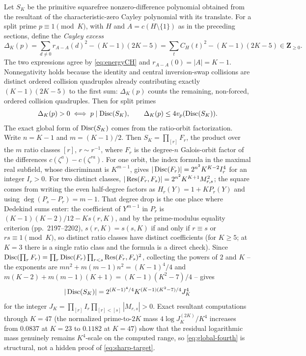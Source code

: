 Let $S_K$ be the primitive squarefree nonzero-difference polynomial obtained
from the resultant of the characteristic-zero Cayley polynomial with its
translate.  For a split prime $p\equiv1\pmod K$, with $H$ and
$A=c(H\setminus\{1\})$ as in the preceding sections, define the
\emph{Cayley excess}
\begin{equation}\label{eq:Delta-def}
\Delta_K(p)
 =\sum_{d\ne0}r_{A-A}(d)^2-(K-1)(2K-5)
 =\sum_tC_H(t)^2-(K-1)(2K-5)\in\mathbf Z_{\ge0}.
\end{equation}
The two expressions agree by \eqref{eq:energyCH} and
$r_{A-A}(0)=|A|=K-1$.  Nonnegativity holds because the identity and central
inversion-swap collisions are distinct ordered collision quadruples already
contributing exactly $(K-1)(2K-5)$ to the first sum: $\Delta_K(p)$ counts
the remaining, non-forced, ordered collision quadruples.  Then for split
primes
\begin{equation}\label{eq:disc-class}
\Delta_K(p)>0\iff p\mid\operatorname{Disc}(S_K),
\qquad
\Delta_K(p)\le4v_p(\operatorname{Disc}(S_K)).
\end{equation}
The exact global form of $\operatorname{Disc}(S_K)$ comes from the ratio-orbit
factorization.  Write $n=K-1$ and $m=(K-1)/2$.  Then
$S_K=\prod_{[r]}F_r$, the product over the $m$ ratio classes
$[r]$, $r\sim r^{-1}$, where $F_r$ is the degree-$n$ Galois-orbit factor of
the differences $c(\zeta^a)-c(\zeta^{ra})$.  For one orbit, the index
formula in the maximal real subfield, whose discriminant is $K^{m-1}$,
gives $|\operatorname{Disc}(F_r)|=2^{n^2}K^{K-2}I_r^4$ for an integer $I_r>0$.  For two
distinct classes, $|\operatorname{Res}(F_r,F_s)|=2^{n^2}K^{K+1}M_{r,s}^2$; the square
comes from writing the even half-degree factors as $H_r(Y)=1+KP_r(Y)$ and
using $\deg(P_s-P_r)=m-1$.  That degree drop is the one place where
Dedekind sums enter: the coefficient of $Y^{m-1}$ in $P_r$ is
$(K-1)(K-2)/12-Ks(r,K)$, and by the prime-modulus equality criterion
\cite[Corollary~1.2]{JRW2011} (pp.~2197--2202), $s(r,K)=s(s,K)$ if and
only if $r\equiv s$ or $rs\equiv1\pmod K$, so distinct ratio classes have
distinct coefficients (for $K\ge5$; at $K=3$ there is a single ratio class
and the formula is a direct check).  Since
$\operatorname{Disc}(\prod_rF_r)=\prod_r\operatorname{Disc}(F_r)\prod_{r<s}\operatorname{Res}(F_r,F_s)^2$, collecting
the powers of $2$ and $K$ -- the exponents are
$mn^2+m(m-1)n^2=(K-1)^4/4$ and $m(K-2)+m(m-1)(K+1)=(K-1)(K^2-7)/4$ -- gives
\begin{equation}\label{eq:global-fourth}
|\operatorname{Disc}(S_K)|
 =2^{(K-1)^4/4}K^{(K-1)(K^2-7)/4}J_K^4
\end{equation}
for the integer
$J_K=\prod_{[r]}I_r\prod_{[r]<[s]}|M_{r,s}|>0$.  Exact resultant
computations through $K=47$ (the normalized prime-to-$2K$ mass
$4\log J_K^{(2K)}/K^4$ increases from $0.0837$ at $K=23$ to $0.1182$ at
$K=47$) show that the residual logarithmic mass genuinely remains
$K^4$-scale on the computed range, so \eqref{eq:global-fourth} is
structural, not a hidden proof of \eqref{eq:sharp-target}.

